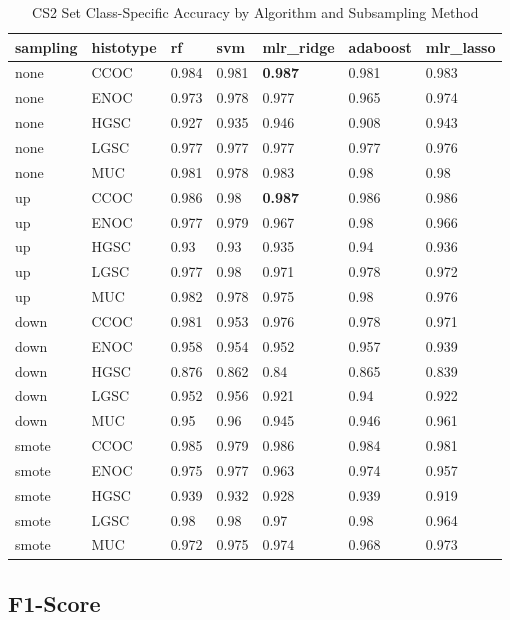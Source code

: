 \documentclass[
]{report}
\begin{document}
\begin{table}

\caption{\label{tab:cs2-accuracy-class-table}CS2 Set Class-Specific Accuracy by Algorithm and Subsampling Method}
\centering
\begin{tabular}[t]{l|l|l|l|l|l|l}
\hline
sampling & histotype & rf & svm & mlr\_ridge & adaboost & mlr\_lasso\\
\hline
none & CCOC & 0.984 & 0.981 & \textbf{0.987} & 0.981 & 0.983\\
\hline
none & ENOC & 0.973 & 0.978 & 0.977 & 0.965 & 0.974\\
\hline
none & HGSC & 0.927 & 0.935 & 0.946 & 0.908 & 0.943\\
\hline
none & LGSC & 0.977 & 0.977 & 0.977 & 0.977 & 0.976\\
\hline
none & MUC & 0.981 & 0.978 & 0.983 & 0.98 & 0.98\\
\hline
up & CCOC & 0.986 & 0.98 & \textbf{0.987} & 0.986 & 0.986\\
\hline
up & ENOC & 0.977 & 0.979 & 0.967 & 0.98 & 0.966\\
\hline
up & HGSC & 0.93 & 0.93 & 0.935 & 0.94 & 0.936\\
\hline
up & LGSC & 0.977 & 0.98 & 0.971 & 0.978 & 0.972\\
\hline
up & MUC & 0.982 & 0.978 & 0.975 & 0.98 & 0.976\\
\hline
down & CCOC & 0.981 & 0.953 & 0.976 & 0.978 & 0.971\\
\hline
down & ENOC & 0.958 & 0.954 & 0.952 & 0.957 & 0.939\\
\hline
down & HGSC & 0.876 & 0.862 & 0.84 & 0.865 & 0.839\\
\hline
down & LGSC & 0.952 & 0.956 & 0.921 & 0.94 & 0.922\\
\hline
down & MUC & 0.95 & 0.96 & 0.945 & 0.946 & 0.961\\
\hline
smote & CCOC & 0.985 & 0.979 & 0.986 & 0.984 & 0.981\\
\hline
smote & ENOC & 0.975 & 0.977 & 0.963 & 0.974 & 0.957\\
\hline
smote & HGSC & 0.939 & 0.932 & 0.928 & 0.939 & 0.919\\
\hline
smote & LGSC & 0.98 & 0.98 & 0.97 & 0.98 & 0.964\\
\hline
smote & MUC & 0.972 & 0.975 & 0.974 & 0.968 & 0.973\\
\hline
\end{tabular}
\end{table}

\hypertarget{f1-score-3}{%
\subsection{F1-Score}\label{f1-score-3}}
\end{document}
